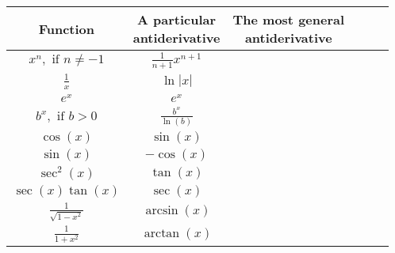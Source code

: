 \documentclass{standalone}
\begin{document}
\begin{tabular}{Sc | Sc | Sc}
  \parbox{2.5cm}{\centering\textbf{Function}}& \parbox{3cm}{\centering\textbf{A particular}\\\textbf{antiderivative}} & \parbox{4cm}{\centering\textbf{The most general}\\\textbf{antiderivative}} \\
  \hline\hline
  \(x^{n}, \text{ if } n \ne -1\)  & \(\frac{1}{n+1} x^{n+1}\) & \\ %
  \(\frac{1}{x}\) & \(\ln|x|\) & \\ %
  \(e^{x}\) & \(e^{x}\) & \\ %
  \(b^{x}, \text{ if } b > 0\) & \(\frac{b^{x}}{\ln(b)}\) & \\ %
  \(\cos(x)\) & \(\sin(x)\) & \\ %
  \(\sin(x)\) & \(-\cos(x)\) & \\ %
  \(\sec^{2}(x)\) & \(\tan(x)\) & \\ %
  \(\sec(x)\tan(x)\) & \(\sec(x)\) & \\ %
  \(\frac{1}{\sqrt{1 - x^{2}}}\) &  \(\arcsin(x)\) & \\ %
  \(\frac{1}{1 + x^{2}}\) & \(\arctan(x)\) & \\ %
\end{tabular}
\end{document}
